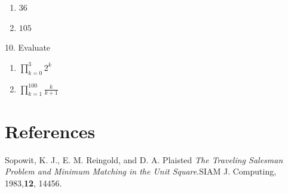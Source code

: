 \documentclass[10pt,]{book}
\theoremstyle{plain}
\theoremstyle{definition}
\theoremstyle{definition}
\theoremstyle{definition}
\theoremstyle{definition}
\begin{document}
\begin{exercisegroup}
\leavevmode%
\begin{multicols}{2}
\begin{enumerate}[label=\alph*]
\item\hypertarget{li-256}{} \(36\)%
\item\hypertarget{li-257}{} \(105\)%
\end{enumerate}
\end{multicols}
%
\item[10.]\hypertarget{exercise-41}{}Evaluate%
\par
\leavevmode%
\begin{multicols}{2}
\begin{enumerate}[label=\alph*]
\item\hypertarget{li-258}{}   \(\prod _{k=0}^3 2^k\)%
\item\hypertarget{li-259}{}   \(\prod _{k=1}^{100} \frac{k}{k+1}\)%
\end{enumerate}
\end{multicols}
%
\par\smallskip
\end{exercisegroup}
\par\smallskip\noindent
%
\backmatter
%
%
%
\typeout{************************************************}
\typeout{************************************************}
\chapter[References]{References}\label{references-1}
\begin{referencelist}
\hypertarget{biblio-sopowit-1983}{}Sopowit, K. J., E. M. Reingold, and D. A. Plaisted \textit{The Traveling Salesman Problem and Minimum Matching in the Unit Square}.SIAM J. Computing, 1983,\textbf{12}, 144\textendash{}56.
\end{referencelist}
%
\printindex
%
\end{document}
